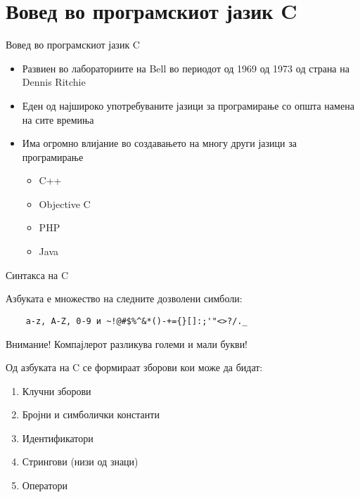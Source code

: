 \section{Вовед во програмскиот јазик C}

\begin{frame}{Вовед во програмскиот јазик C}
\begin{itemize}
\item Развиен во лабораториите на Bell во периодот од 1969 од 1973 од страна на Dennis Ritchie
\item Еден од најшироко употребуваните јазици за програмирање со општа намена на сите времиња
\item Има огромно влијание во создавањето на многу други јазици за програмирање
    \begin{itemize}
    \item C++
    \item Objective C
    \item PHP
    \item Java
    \end{itemize}
\end{itemize}
\end{frame}
\begin{frame}[fragile]{Синтакса на C}

  \begin{block}{Азбуката е множество на следните дозволени симболи:}
  \begin{verbatim}
    a-z, A-Z, 0-9 и ~!@#$%^&*()-+={}[]:;'"<>?/._  
  \end{verbatim}
  \end{block}

    \begin{alertblock}{Внимание!}
    Компајлерот разликува големи и мали букви!
    \end{alertblock}

    Од азбуката на C се формираат зборови кои може да бидат:
    \begin{enumerate}
    \item Клучни зборови
    \item Бројни и симболички константи
    \item Идентификатори
    \item Стрингови (низи од знаци)
    \item Оператори
    \end{enumerate}

\end{frame}

